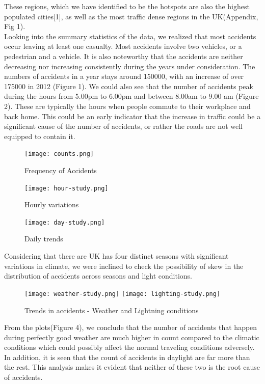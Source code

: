 \documentclass{neu_handout}
\begin{document}
These regions, which we have identified to be the hotspots are also the highest populated cities[1], as well as the most traffic dense regions in the UK(Appendix, Fig 1). \\

Looking into the summary statistics of the data, we realized that most accidents occur leaving at least one casualty. Most accidents involve two vehicles, or a pedestrian and a vehicle. It is also noteworthy that the accidents are neither decreasing nor increasing consistently during the years under consideration. The numbers of accidents in a year stays around 150000, with  an increase of over 175000 in 2012 (Figure 1). We could also see that the number of accidents peak during the hours from 5.00pm to 6.00pm and between 8.00am to 9.00 am (Figure 2). These are typically the hours when people commute to their workplace and back home. This could be an early indicator that the increase in traffic could be a significant cause of the number of accidents, or rather the roads are not well equipped to contain it. \\

\begin{figure}[!htb]
  \texttt{[image: counts.png]}
  \caption{Frequency of Accidents}\label{fig:frequency}
\endminipage\hfill
{}
  \texttt{[image: hour-study.png]}
  \caption{Hourly variations}\label{fig:hour-study}
\endminipage\hfill
{}
  \texttt{[image: day-study.png]}
  \caption{Daily trends}\label{fig:day_study}
\endminipage
\end{figure}

Considering that there are UK has four distinct seasons with significant variations in climate, we were inclined to check the possibility of skew in the distribution of accidents across seasons
and light conditions. \\

\begin{figure}[!htb]
  \texttt{[image: weather-study.png]}
\endminipage\hfill
{}
  \texttt{[image: lighting-study.png]}
  \endminipage
\caption{Trends in accidents - Weather and Lightning conditions}  
\end{figure}

From the plots(Figure 4), we conclude that the number of accidents that happen during perfectly good weather are much higher in count compared to the climatic conditions which could possibly affect the normal traveling conditions adversely. In addition, it is seen that the count of accidents in daylight are far more than the rest. This analysis makes it evident that neither of these two is the root cause of accidents. \\
\end{document}
